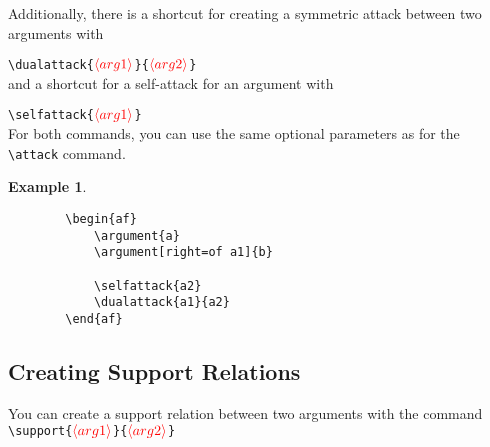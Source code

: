 \documentclass{article}
\newcommand{\opt}[2][red]{\ensuremath{\textcolor{#1}{\langle #2\rangle}}}
\newtheorem{example}{Example}
\begin{document}
    Additionally, there is a shortcut for creating a symmetric attack between two arguments with

    \noindent
    \verb|\dualattack{|\opt{arg1}\verb|}{|\opt{arg2}\verb|}|\\

    \noindent
    and a shortcut for a self-attack for an argument with

    \noindent
    \verb|\selfattack{|\opt{arg1}\verb|}|\\

    \noindent
    For both commands, you can use the same optional parameters as for the \verb|\attack| command.

    \begin{example}~
    \begin{verbatim}
        \begin{af}
            \argument{a}
            \argument[right=of a1]{b}
    
            \selfattack{a2}
            \dualattack{a1}{a2}
        \end{af}  
    \end{verbatim}

    \begin{center}
        \begin{af}
    
        \end{af}
    \end{center}
    \end{example}
    

\subsection{Creating Support Relations}
    You can create a support relation between two arguments with the command\\

    \noindent
    \verb|\support{|\opt{arg1}\verb|}{|\opt{arg2}\verb|}|
\end{document}
